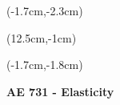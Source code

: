 \documentclass[12pt, oneside]{article}
\begin{document}
\begin{textblock*}{4cm}(-1.7cm,-2.3cm)
\end{textblock*}

\begin{textblock*}{8cm}(12.5cm,-1cm)
\end{textblock*}
\begin{textblock*}{13.5cm}(-1.7cm,-1.8cm)
\end{textblock*}

\vspace{1cm}

\begin{center}
\textbf{\Large AE 731 - Elasticity}
\end{center}
\end{document}
